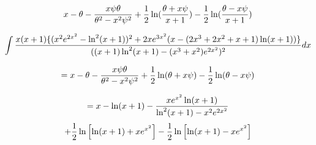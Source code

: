 {\LARGE$$x - \theta - {x\psi\theta\over{\theta^2-x^2\psi^2}} + {1\over2}\ln({{\theta + x \psi}\over{x+1}}) - {1\over2}\ln({{\theta - x \psi}\over{x+1}})$$}


$$\int{{x(x+1)\{(x^2e^{2x^2}-\ln^2(x+1))^2+2xe^{3x^2}(x-(2x^3+2x^2+x+1)\ln(x+1))\}}\over{((x+1)\ln^2(x+1) - (x^3+x^2)e^{2x^2})^2}} dx$$

{\LARGE$$= x - \theta - {x\psi\theta\over{\theta^2-x^2\psi^2}} + {1\over2}\ln(\theta + x \psi) - {1\over2}\ln(\theta - x \psi)$$}

$$= x - \ln(x+1) - {x e^{x^2}\ln(x+1)\over{\ln^2(x+1)-x^2 e^{2x^2}}}$$
$$+ {1\over2}\ln\left[\ln(x+1) + x e^{x^2}\right] - {1\over2}\ln\left[\ln(x+1) - x e^{x^2}\right]$$

\endexample
